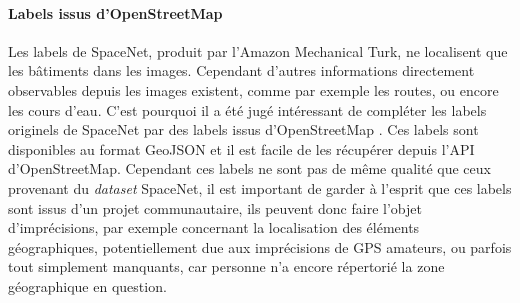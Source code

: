 \documentclass[a4paper, 11pt]{report}
\begin{document}
\paragraph{Labels issus d'OpenStreetMap}
Les labels de SpaceNet, produit par l'Amazon Mechanical Turk, ne localisent que les bâtiments dans les images. Cependant d'autres informations directement observables depuis les images existent, comme par exemple les routes, ou encore les cours d'eau.
C'est pourquoi il a été jugé intéressant de compléter les labels originels de SpaceNet par des labels issus d'OpenStreetMap \citep{OpenStreetMap2017}.
Ces labels sont disponibles au format GeoJSON et il est facile de les récupérer depuis l'API d'OpenStreetMap.
Cependant ces labels ne sont pas de même qualité que ceux provenant du \emph{dataset} SpaceNet, il est important de garder à l'esprit que ces labels sont issus d'un projet communautaire, ils peuvent donc faire l'objet d'imprécisions, par exemple concernant la localisation des éléments géographiques, potentiellement due aux imprécisions de GPS amateurs, ou parfois tout simplement manquants, car personne n'a encore répertorié la zone géographique en question.
\end{document}
